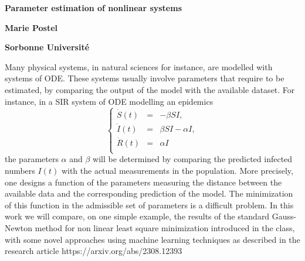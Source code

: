 \documentclass{article}
\begin{document}
\centerline{\large\bf Parameter estimation of nonlinear systems}
\vskip 1cm
\centerline{\large\bf Marie Postel}
\vskip 1cm
\centerline{\large\bf Sorbonne Université}
\vskip 1cm
Many physical systems, in natural sciences for instance, are modelled with systems of ODE. These systems usually involve parameters that require to be estimated, by comparing the output of the model with the available dataset. For instance, in a SIR system of ODE modelling an epidemics 
$$
\left\{\begin{array}{ccl}
\dot S(t)&=&-\beta SI,\\
\dot I(t)&=&\beta SI-\alpha I,\\
\dot R(t)&=&\alpha I\\
\end{array}
\right.
$$
the parameters $ \alpha$ and $\beta$  will be determined by comparing the predicted infected numbers $I(t)$ with the actual measurements in the population. More precisely, one designs a  function of the parameters measuring the distance between the available data and the corresponding prediction of the model. The minimization of this function in the admissible set of parameters is a difficult problem. In this work we will compare, on one simple example,  the results of the  standard Gauss-Newton method for non linear least square minimization introduced in the class, with some novel approaches using machine learning techniques as described in the research article https://arxiv.org/abs/2308.12393
\end{document}
